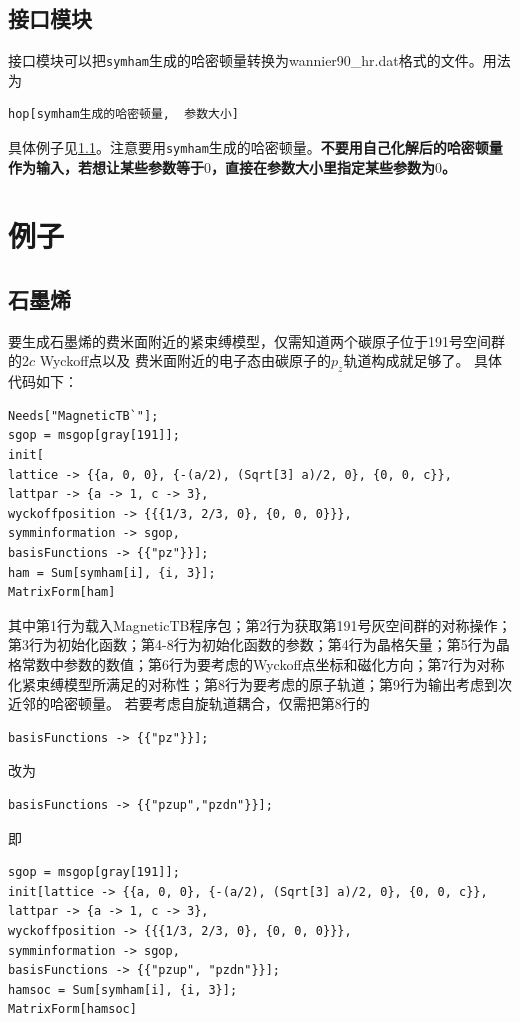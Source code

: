 \documentclass[titlepage,a4paper,12pt,AutoFakeBold]{article}
\begin{document}
\subsection{接口模块}
接口模块可以把\lstinline|symham|生成的哈密顿量转换为wannier90\_hr.dat格式的文件。用法为
\begin{lstlisting}[numbers=none]
hop[symham生成的哈密顿量,  参数大小]
\end{lstlisting}
具体例子见\ref{gra}。注意要用\lstinline|symham|生成的哈密顿量。\textbf{不要用自己化解后的哈密顿量作为输入，若想让某些参数等于$0$，直接在参数大小里指定某些参数为$0$。}

\section{例子}
\subsection{石墨烯}
\label{gra}
要生成石墨烯的费米面附近的紧束缚模型，仅需知道两个碳原子位于191号空间群的$2c$ Wyckoff点以及
费米面附近的电子态由碳原子的$p_z$轨道构成就足够了。
具体代码如下：
\begin{lstlisting}
Needs["MagneticTB`"];
sgop = msgop[gray[191]];
init[
lattice -> {{a, 0, 0}, {-(a/2), (Sqrt[3] a)/2, 0}, {0, 0, c}},
lattpar -> {a -> 1, c -> 3},
wyckoffposition -> {{{1/3, 2/3, 0}, {0, 0, 0}}},
symminformation -> sgop,
basisFunctions -> {{"pz"}}];
ham = Sum[symham[i], {i, 3}]; 
MatrixForm[ham]
\end{lstlisting}
其中第1行为载入\textsf{MagneticTB}程序包；第2行为获取第191号灰空间群的对称操作；第3行为初始化函数；第4-8行为初始化函数的参数；第4行为晶格矢量；第5行为晶格常数中参数的数值；第6行为要考虑的Wyckoff点坐标和磁化方向；第7行为对称化紧束缚模型所满足的对称性；第8行为要考虑的原子轨道；第9行为输出考虑到次近邻的哈密顿量。
若要考虑自旋轨道耦合，仅需把第8行的
\begin{lstlisting}[numbers=none]
	basisFunctions -> {{"pz"}}];
\end{lstlisting}
改为
\begin{lstlisting}[numbers=none]
	basisFunctions -> {{"pzup","pzdn"}}];
\end{lstlisting}
即
\begin{lstlisting}[numbers=none]
sgop = msgop[gray[191]];
init[lattice -> {{a, 0, 0}, {-(a/2), (Sqrt[3] a)/2, 0}, {0, 0, c}}, 
lattpar -> {a -> 1, c -> 3}, 
wyckoffposition -> {{{1/3, 2/3, 0}, {0, 0, 0}}}, 
symminformation -> sgop,
basisFunctions -> {{"pzup", "pzdn"}}];
hamsoc = Sum[symham[i], {i, 3}]; 
MatrixForm[hamsoc]
\end{lstlisting}
\end{document}
